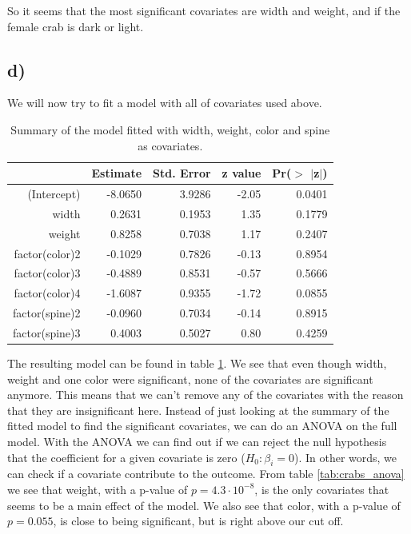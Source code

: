 \documentclass[a4paper,norsk, 10pt]{article}
\begin{document}
So it seems that the most significant covariates are width and weight, and if the female crab is dark or light.


\subsection{d)}

We will now try to fit a model with all of covariates used above.

\begin{table}[!htb]
\centering
\begin{tabular}{rrrrr}
  \hline
 & Estimate & Std. Error & z value & Pr($>$ $|$z$|$) \\ 
  \hline
(Intercept) & -8.0650 & 3.9286 & -2.05 & 0.0401 \\ 
  width & 0.2631 & 0.1953 & 1.35 & 0.1779 \\ 
  weight & 0.8258 & 0.7038 & 1.17 & 0.2407 \\ 
  factor(color)2 & -0.1029 & 0.7826 & -0.13 & 0.8954 \\ 
  factor(color)3 & -0.4889 & 0.8531 & -0.57 & 0.5666 \\ 
  factor(color)4 & -1.6087 & 0.9355 & -1.72 & 0.0855 \\ 
  factor(spine)2 & -0.0960 & 0.7034 & -0.14 & 0.8915 \\ 
  factor(spine)3 & 0.4003 & 0.5027 & 0.80 & 0.4259 \\ 
   \hline
\end{tabular}
\caption{Summary of the model fitted with width, weight, color and spine as covariates.}\label{tab:crabs_all}
\end{table}

The resulting model can be found in table \ref{tab:crabs_all}. We see that even though width, weight and one color were significant, none of the covariates are significant anymore. This means that we can't remove any of the covariates with the reason that they are insignificant here. Instead of just looking at the summary of the fitted model to find the significant covariates, we can do an ANOVA on the full model. With the ANOVA we can find out if we can reject the null hypothesis that the coefficient for a given covariate is zero ($H_0: \beta_i = 0$). In other words, we can check if a covariate contribute to the outcome. From table \ref{tab:crabs_anova} we see that weight, with a p-value of $p= 4.3\cdot 10^{-8}$, is the only covariates that seems to be a main effect of the model. We also see that color, with a p-value of $p= 0.055$, is close to being significant, but is right above our cut off.
\end{document}
